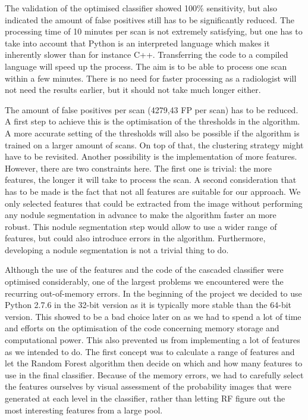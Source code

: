 The validation of the optimised classifier showed 100\% sensitivity, but also
indicated the amount of false positives still has to be significantly reduced.
The processing time of 10 minutes per scan is not extremely satisfying, but one
has to take into account that Python is an interpreted language which makes it
inherently slower than for instance C++. Transferring the code to a compiled
language will speed up the process. The aim is to be able to process one scan
within a few minutes. There is no need for faster processing as a radiologist
will not need the results earlier, but it should not take much longer either.

The amount of false positives per scan (4279,43 FP per scan) has to be reduced.
A first step to achieve this is the optimisation of the thresholds in the
algorithm. A more accurate setting of the thresholds will also be possible if the
algorithm is trained on a larger amount of scans. On top of that, the clustering
strategy might have to be revisited. Another possibility is the implementation
of more features. However, there are two constraints here. The first
one is trivial: the more features, the longer it will take to process the scan.
A second consideration that has to be made is the fact that not all features are
suitable for our approach. We only selected features that could be extracted
from the image without performing any nodule segmentation in advance to make the
algorithm faster an more robust. This nodule segmentation step would allow to
use a wider range of features, but could also introduce errors in the algorithm.
Furthermore, developing a nodule segmentation is not a trivial thing to do.

Although the use of the features and the code of the cascaded classifier were
optimised considerably, one of the largest problems we encountered were the
recurring out-of-memory errors. In the beginning of the project we decided to
use Python 2.7.6 in the 32-bit version as it is typically more stable than the
64-bit version. This showed to be a bad choice later on as we had to spend a lot
of time and efforts on the optimisation of the code concerning memory storage
and computational power. This also prevented us from implementing a lot of
features as we intended to do. The first concept was to calculate a range of
features and let the Random Forest algorithm then decide on which and how many
features to use in the final classifier. Because of the memory errors, we had to
carefully select the features ourselves by visual assessment of the probability
images that were generated at each level in the classifier, rather than letting
RF figure out the most interesting features from a large pool.

